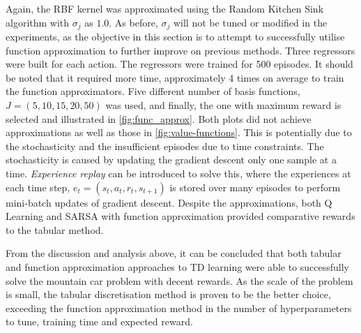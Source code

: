 \documentclass{article}
\begin{document}
Again, the RBF kernel was approximated using the Random Kitchen Sink algorithm with $\sigma_j$ as $1.0$. As before, $\sigma_j$ will not be tuned or modified in the experiments, as the objective in this section is to attempt to successfully utilise function approximation to further improve on previous methods. Three regressors were built for each action. The regressors were trained for 500 episodes. It should be noted that it required more time, approximately 4 times on average to train the function approximators. Five different number of basis functions, $J = (5, 10, 15, 20, 50)$ was used, and finally, the one with maximum reward is selected and illustrated in \cref{fig:func_approx}. Both plots did not achieve approximations as well as those in \cref{fig:value-functions}. This is potentially due to the stochasticity and the insufficient episodes due to time constraints. The stochasticity is caused by updating the gradient descent only one sample at a time. \emph{Experience replay} can be introduced to solve this, where the experiences at each time step, $e_t = (s_t, a_t, r_t, s_{t+1})$ is stored over many episodes to perform mini-batch updates of gradient descent. Despite the approximations, both Q Learning and SARSA with function approximation provided comparative rewards to the tabular method.


From the discussion and analysis above, it can be concluded that both tabular and function approximation approaches to TD learning were able to successfully solve the mountain car problem with decent rewards. As the scale of the problem is small, the tabular discretisation method is proven to be the better choice, exceeding the function approximation method in the number of hyperparameters to tune, training time and expected reward.
\end{document}
